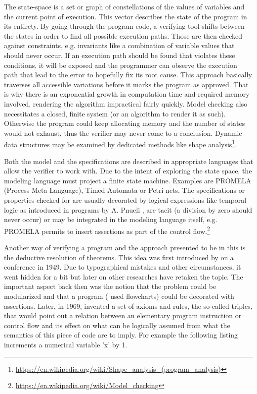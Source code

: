 The state-space is a set or graph of constellations of the values of variables and the current point of execution. This vector describes the state of the program in its entirety. By going through the program code, a verifying tool shifts between the states in order to find all possible execution paths. Those are then checked against constraints, e.g. invariants like a combination of variable values that should never occur. If an execution path should be found that violates these conditions, it will be exposed and the programmer can observe the execution path that lead to the error to hopefully fix its root cause. This approach basically traverses all accessible variations before it marks the program as approved. That is why there is an exponential growth in computation time and required memory involved, rendering the algorithm impractical fairly quickly. Model checking also necessitates a closed, finite system (or an algorithm to render it as such). Otherwise the program could keep allocating memory and the number of states would not exhaust, thus the verifier may never come to a conclusion. Dynamic data structures may be examined by dedicated methods like shape analysis\footnote{\url{https://en.wikipedia.org/wiki/Shape_analysis_(program_analysis)}}.

Both the model and the specifications are described in appropriate languages that allow the verifier to work with. Due to the intent of exploring the state space, the modeling language must project a finite state machine. Examples are PROMELA (Process Meta Language), Timed Automata or Petri nets. The specifications or properties checked for are usually decorated by logical expressions like temporal logic as introduced in programs by A. Pnueli \cite{Pnueli:1977:TLP:1382431.1382534}, are tacit (a division by zero should never occur) or may be integrated in the modeling language itself, e.g. PROMELA permits to insert assertions as part of the control flow.\footnote{\url{https://en.wikipedia.org/wiki/Model_checking}}

Another way of verifying a program and the approach presented to be in this \paper{} is the deductive resolution of theorems. This idea was first introduced by  on a conference in 1949. Due to typographical mistakes and other circumstances, it went hidden for a bit but later on other researches have retaken the topic. The important aspect back then was the notion that the problem could be modularized and that a program ( used flowcharts) could be decorated with assertions. Later, in 1969,  invented a set of axioms and rules, the so-called  triples, that would point out a relation between an elementary program instruction or control flow and its effect on what can be logically assumed from what the semantics of this piece of code are to imply. For example the following listing increments a numerical variable 'x' by 1.

